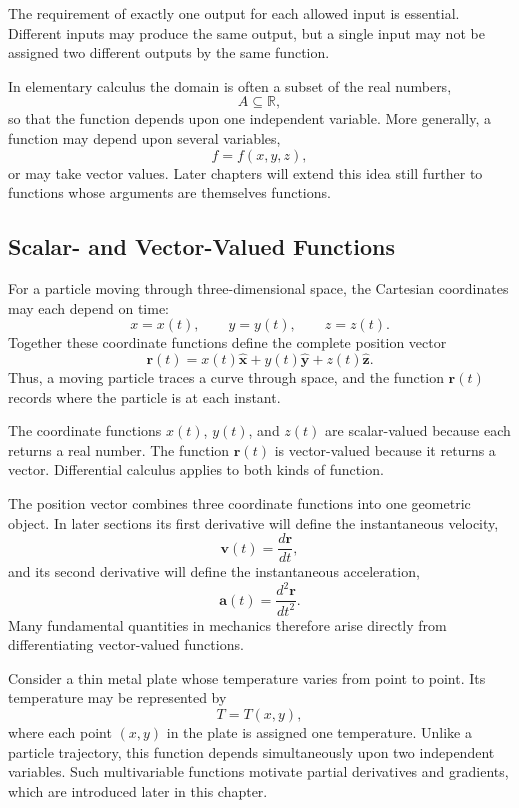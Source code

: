 The requirement of exactly one output for each allowed input is essential. Different inputs may produce the same output, but a single input may not be assigned two different outputs by the same function.

In elementary calculus the domain is often a subset of the real numbers,
\[
A\subseteq\mathbb R,
\]
so that the function depends upon one independent variable. More generally, a function may depend upon several variables,
\[
f=f(x,y,z),
\]
or may take vector values. Later chapters will extend this idea still further to functions whose arguments are themselves functions.

\subsection{Scalar- and Vector-Valued Functions}

For a particle moving through three-dimensional space, the Cartesian coordinates may each depend on time:
\[
x=x(t),
\qquad
y=y(t),
\qquad
z=z(t).
\]
Together these coordinate functions define the complete position vector
\[
\boxed{
\mathbf r(t)
=
x(t)\hat{\mathbf x}
+
y(t)\hat{\mathbf y}
+
z(t)\hat{\mathbf z}.
}
\]
Thus, a moving particle traces a curve through space, and the function \(\mathbf r(t)\) records where the particle is at each instant.

\begin{bookremark}
The coordinate functions \(x(t)\), \(y(t)\), and \(z(t)\) are scalar-valued because each returns a real number. The function \(\mathbf r(t)\) is vector-valued because it returns a vector. Differential calculus applies to both kinds of function.
\end{bookremark}

The position vector combines three coordinate functions into one geometric object. In later sections its first derivative will define the instantaneous velocity,
\[
\mathbf v(t)=\frac{d\mathbf r}{dt},
\]
and its second derivative will define the instantaneous acceleration,
\[
\mathbf a(t)=\frac{d^2\mathbf r}{dt^2}.
\]
Many fundamental quantities in mechanics therefore arise directly from differentiating vector-valued functions.

\begin{bookexample}
Consider a thin metal plate whose temperature varies from point to point. Its temperature may be represented by
\[
T=T(x,y),
\]
where each point \((x,y)\) in the plate is assigned one temperature. Unlike a particle trajectory, this function depends simultaneously upon two independent variables. Such multivariable functions motivate partial derivatives and gradients, which are introduced later in this chapter.
\end{bookexample}

